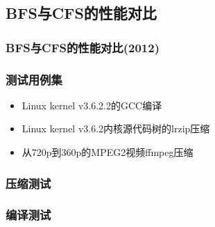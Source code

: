 \subsection{BFS与CFS的性能对比} %
\begin{frame}[fragile]
    \frametitle{BFS与CFS的性能对比(2012)}
    \begin{figure}
    \end{figure}

\end{frame}
% 
% 
\begin{frame}[fragile]
    \frametitle{测试用例集}
    \begin{itemize}
        \item Linux kernel v3.6.2.2的GCC编译
        \item Linux kernel v3.6.2内核源代码树的lrzip压缩
        \item 从720p到360p的MPEG2视频ffmpeg压缩
        \end{itemize}
\end{frame}
% 
% 
% 
\begin{frame}[fragile]
    \frametitle{压缩测试}
    \begin{figure}
    \end{figure}

\end{frame}
% 
% 
\begin{frame}[fragile]
    \frametitle{编译测试}
    \begin{figure}
    \end{figure}

\end{frame}
